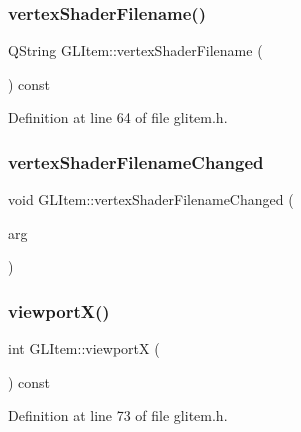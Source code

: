 \subsubsection{\texorpdfstring{vertexShaderFilename()}{vertexShaderFilename()}}
{\footnotesize\ttfamily Q\+String G\+L\+Item\+::vertex\+Shader\+Filename (\begin{DoxyParamCaption}{ }\end{DoxyParamCaption}) const\hspace{0.3cm}{\ttfamily [inline]}}



Definition at line 64 of file glitem.\+h.

\mbox{\label{class_g_l_item_a2fea9c2dace4fa8f74b26a4d8c7d34c1}} 
\subsubsection{\texorpdfstring{vertexShaderFilenameChanged}{vertexShaderFilenameChanged}}
{\footnotesize\ttfamily void G\+L\+Item\+::vertex\+Shader\+Filename\+Changed (\begin{DoxyParamCaption}\item[{Q\+String}]{arg }\end{DoxyParamCaption})\hspace{0.3cm}{\ttfamily [signal]}}

\mbox{\label{class_g_l_item_ad9b8583ed12cdc4eadb5a23e3a9c0791}} 
\subsubsection{\texorpdfstring{viewportX()}{viewportX()}}
{\footnotesize\ttfamily int G\+L\+Item\+::viewportX (\begin{DoxyParamCaption}{ }\end{DoxyParamCaption}) const\hspace{0.3cm}{\ttfamily [inline]}}



Definition at line 73 of file glitem.\+h.

\mbox{\label{class_g_l_item_aa79438b1da8394ef68e912afdb78670c}} 
